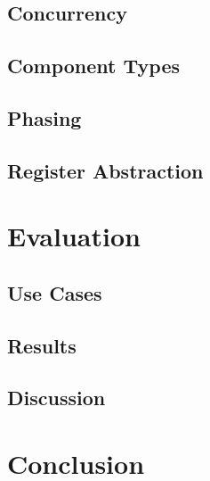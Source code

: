 \documentclass[11pt]{book}
\begin{document}
\section{Concurrency} %

\section{Component Types}

\section{Phasing}

\section{Register Abstraction}


\chapter{Evaluation} %

\section{Use Cases} %

\section{Results} %

\section{Discussion} %



\chapter{Conclusion} %

\printbibliography
\end{document}
